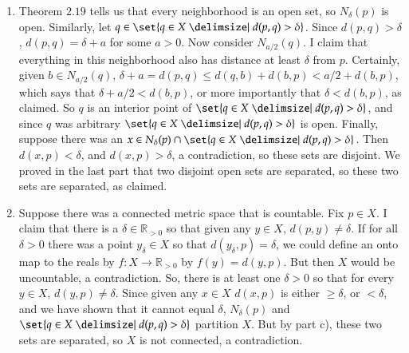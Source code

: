 \documentclass[12pt]{article}
\def\mbb#1{\mathbb{#1}}
\def \R{\mbb{R}}
\theoremstyle{definition}
\theoremstyle{remark}
\begin{document}
\begin{enumerate}[leftmargin=\labelsep]
\begin{enumerate}
			\item Theorem $2.19$ tells us that every neighborhood is an open set, so $N_\delta(p)$ is open. Similarly, let $q \in \set{q \in X \given d(p, q) > \delta}$. Since $d(p, q) > \delta$, $d(p, q) = \delta + a$ for some $a > 0$. Now consider $N_{a/2}(q)$. I claim that everything in this neighborhood also has distance at least $\delta$ from $p$. Certainly, given $b \in N_{a/2}(q)$, $\delta + a = d(p, q) \leq d(q, b) + d(b, p) < a/2 + d(b, p)$, which says that $\delta + a/2 < d(b,p)$, or more importantly that $\delta < d(b, p)$, as claimed. So $q$ is an interior point of $\set{q \in X \given d(p, q) > \delta}$, and since $q$ was arbitrary $\set{q \in X \given d(p, q) > \delta}$ is open. Finally, suppose there was an $x \in N_\delta(p) \cap \set{q \in X \given d(p, q) > \delta}$. Then $d(x, p) < \delta$, and $d(x, p) > \delta$, a contradiction, so these sets are disjoint. We proved in the last part that two disjoint open sets are separated, so these two sets are separated, as claimed.
			
			\item Suppose there was a connected metric space that is countable. Fix $p \in X$. I claim that there is a $\delta \in \R_{> 0}$ so that given any $y \in X$, $d(p, y) \neq \delta$. If for all $\delta > 0$ there was a point $y_{\delta} \in X$ so that $d(y_{\delta}, p) = \delta$, we could define an onto map to the reals by $f: X \to \R_{> 0}$ by $f(y) = d(y, p)$. But then $X$ would be uncountable, a contradiction. So, there is at least one $\delta > 0$ so that for every $y \in X$, $d(y, p) \neq \delta$. Since given any $x \in X$ $d(x, p)$ is either $\geq \delta$, or $< \delta$, and we have shown that it cannot equal $\delta$, $N_{\delta}(p)$ and $\set{q \in X \given d(p, q) > \delta}$ partition $X$. But by part c), these two sets are separated, so $X$ is not connected, a contradiction.
		\end{enumerate}


\end{enumerate}
\end{document}
